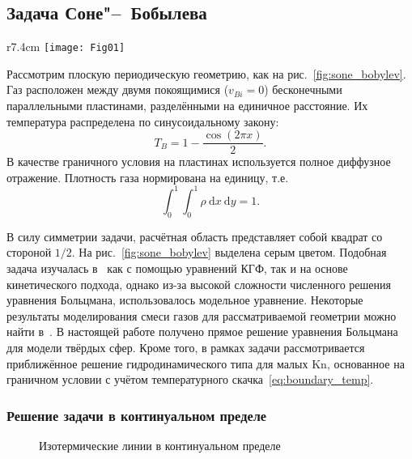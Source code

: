 \documentclass[
aps,%
12pt,%
final,%
notitlepage,%
oneside,%
onecolumn,%
nobibnotes,%
nofootinbib,%
superscriptaddress,%
noshowpacs,%
showkeys,%
centertags]%
{revtex4}
\newcommand{\Kn}{\mathrm{Kn}}
\newcommand{\dd}{\:\mathrm{d}}
\begin{document}
\subsection{Задача Соне"--~Бобылева}

\begin{wrapfigure}{r}{7.4cm}
    \vspace{-10pt}
    \centering
    \texttt{[image: Fig01]}
    \vspace{-20pt}
    \caption{Геометрия задачи Соне"--~Бобылева}\label{fig:sone_bobylev}
    \vspace{20pt}
\end{wrapfigure}

Рассмотрим плоскую периодическую геометрию, как на рис.~\ref{fig:sone_bobylev}.
Газ расположен между двумя покоящимися (\(v_{Bi} = 0\)) бесконечными параллельными пластинами,
разделёнными на единичное расстояние. Их температура распределена по синусоидальному закону:
\begin{equation}
    T_B = 1 - \frac{\cos(2\pi x)}{2}.
\end{equation}
В качестве граничного условия на пластинах используется полное диффузное отражение.
Плотность газа нормирована на единицу, т.е.
\begin{equation}\label{eq:total_mass}
    \int_0^1\int_0^1\rho\dd{x}\dd{y} = 1.
\end{equation}

В силу симметрии задачи, расчётная область представляет собой квадрат со стороной \(1/2\).
На рис.~\ref{fig:sone_bobylev} выделена серым цветом.
Подобная задача изучалась в~\cite{Sone1996} как с помощью уравнений КГФ, так и на основе кинетического подхода,
однако из-за высокой сложности численного решения уравнения Больцмана, использовалось модельное уравнение.
Некоторые результаты моделирования смеси газов для рассматриваемой геометрии можно найти в~\cite{Wu2015}.
В настоящей работе получено прямое решение уравнения Больцмана для модели твёрдых сфер.
Кроме того, в рамках задачи рассмотривается приближённое решение гидродинамического типа для малых \(\Kn\),
основанное на граничном условии с учётом температурного скачка~\eqref{eq:boundary_temp}.

\subsubsection{Решение задачи в континуальном пределе}

\begin{figure}
    \caption{Изотермические линии в континуальном пределе}
    \label{fig:continuum:temp}
\end{figure}
\end{document}
